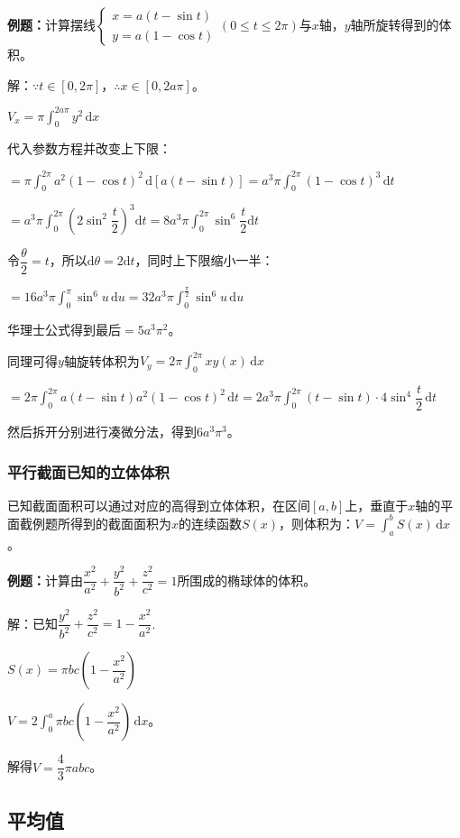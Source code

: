 \documentclass[UTF8, 12pt]{ctexart}
\begin{document}
\textbf{例题：}计算摆线$\left\{\begin{array}{l}
    x=a(t-\sin t) \\
    y=a(1-\cos t)
\end{array}
\right.$$(0\leqslant t\leqslant 2\pi)$与$x$轴，$y$轴所旋转得到的体积。

解：$\because t\in[0,2\pi]$，$\therefore x\in[0,2a\pi]$。

$V_x=\pi\int_0^{2a\pi}y^2\,\textrm{d}x$

代入参数方程并改变上下限：

$=\pi\int_0^{2\pi}a^2(1-\cos t)^2\,\textrm{d}[a(t-\sin t)]=a^3\pi\int_0^{2\pi}(1-\cos t)^3\,\textrm{d}t$

$=a^3\pi\displaystyle{\int_0^{2\pi}\left(2\sin^2\dfrac{t}{2}\right)^3\textrm{d}t}=8a^3\pi\displaystyle{\int_0^{2\pi}\sin^6\dfrac{t}{2}\textrm{d}t}$

令$\dfrac{\theta}{2}=t$，所以$\textrm{d}\theta=2\textrm{d}t$，同时上下限缩小一半：

$=16a^3\pi\int_0^\pi\sin^6u\,\textrm{d}u=32a^3\pi\int_0^{\frac{\pi}{2}}\sin^6u\,\textrm{d}u$

华理士公式得到最后$=5a^3\pi^2$。

同理可得$y$轴旋转体积为$V_y=2\pi\int_0^{2\pi}xy(x)\,\textrm{d}x$

$=2\pi\int_0^{2\pi}a(t-\sin t)a^2(1-\cos t)^2\,\textrm{d}t=2a^3\pi\int_0^{2\pi}(t-\sin t)\cdot 4\sin^4\dfrac{t}{2}\,\textrm{d}t$

然后拆开分别进行凑微分法，得到$6a^3\pi^3$。

\subsubsection{平行截面已知的立体体积}

已知截面面积可以通过对应的高得到立体体积，在区间$[a,b]$上，垂直于$x$轴的平面截例题所得到的截面面积为$x$的连续函数$S(x)$，则体积为：$V=\int_a^bS(x)\,\textrm{d}x$。

\textbf{例题：}计算由$\dfrac{x^2}{a^2}+\dfrac{y^2}{b^2}+\dfrac{z^2}{c^2}=1$所围成的椭球体的体积。

解：已知$\dfrac{y^2}{b^2}+\dfrac{z^2}{c^2}=1-\dfrac{x^2}{a^2}$.

$S(x)=\pi bc\left(1-\dfrac{x^2}{a^2}\right)$

$V=2\int_0^a\pi bc\left(1-\dfrac{x^2}{a^2}\right)\,\textrm{d}x$。

解得$V=\dfrac{4}{3}\pi abc$。

\subsection{平均值}
\end{document}
